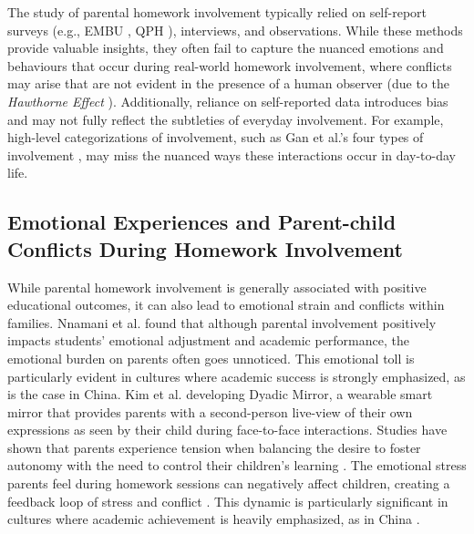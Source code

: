 
The study of parental homework involvement typically relied on self-report surveys  (e.g., EMBU \cite{arrindell1999development}, QPH \cite{dumont2014quality}), interviews, and observations. While these methods provide valuable insights, they often fail to capture the nuanced emotions and behaviours that occur during real-world homework involvement, where conflicts may arise that are not evident in the presence of a human observer (due to the \textit{Hawthorne Effect} \cite{adair1984hawthorne}). Additionally, reliance on self-reported data introduces bias and may not fully reflect the subtleties of everyday involvement. For example, high-level categorizations of involvement, such as Gan et al.'s four types of involvement \cite{gan2019parental}, may miss the nuanced ways these interactions occur in day-to-day life.


\subsection{Emotional Experiences and Parent-child Conflicts During Homework Involvement}


While parental homework involvement is generally associated with positive educational outcomes, it can also lead to emotional strain and conflicts within families. Nnamani et al. \cite{nnamani2020impact} found that although parental involvement positively impacts students' emotional adjustment and academic performance, the emotional burden on parents often goes unnoticed. This emotional toll is particularly evident in cultures where academic success is strongly emphasized, as is the case in China. Kim et al. \cite{kim2020dyadic} developing Dyadic Mirror, a wearable smart mirror that provides parents with a second-person live-view of their own expressions as seen by their child during face-to-face interactions. Studies have shown that parents experience tension when balancing the desire to foster autonomy with the need to control their children's learning \cite{cunha2015parents}. The emotional stress parents feel during homework sessions can negatively affect children, creating a feedback loop of stress and conflict \cite{moe2018brief}. This dynamic is particularly significant in cultures where academic achievement is heavily emphasized, as in China \cite{nnamani2020impact}.


